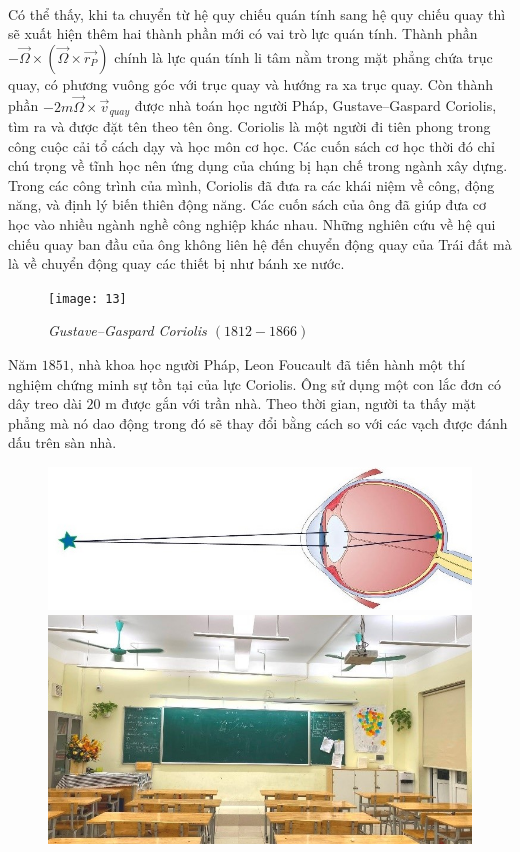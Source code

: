 \begin{multicols}{2}
\begin{align*}
	\end{align*}
	Có thể thấy, khi ta chuyển từ hệ quy chiếu quán tính sang hệ quy chiếu quay thì sẽ xuất hiện thêm hai thành phần mới có vai trò lực quán tính. Thành phần $-\overrightarrow{\Omega}\times\left(\!\!\overrightarrow{\Omega}\times\overrightarrow{r_P}\!\!\right)$ chính là lực quán tính li tâm nằm trong mặt phẳng chứa trục quay, có phương vuông góc với trục quay và hướng ra xa trục quay. Còn thành phần $-2m\overrightarrow{\Omega}\times\overrightarrow{v}\!\!_{quay}$ được nhà toán học người Pháp, Gustave--Gaspard Coriolis, tìm ra và được đặt tên theo tên ông.
	\vskip 0.1cm
	Coriolis là một người đi tiên phong trong công cuộc cải tổ cách dạy và học môn cơ học. Các cuốn sách cơ học thời đó chỉ chú trọng về tĩnh học nên ứng dụng của chúng bị hạn chế trong ngành xây dựng. Trong các công trình của mình, Coriolis đã đưa ra các khái niệm về công, động năng, và định lý biến thiên động năng. Các cuốn sách của ông đã giúp đưa cơ học vào nhiều ngành nghề công nghiệp khác nhau. Những nghiên cứu về hệ qui chiếu quay ban đầu của ông không liên hệ đến chuyển động quay của Trái đất mà là về chuyển động quay các thiết bị như bánh xe nước.	
		\begin{figure}[H]
		\vspace*{-5pt}
		\centering
		\captionsetup{labelformat= empty, justification=centering}
		\texttt{[image: 13]}
		\caption{\small\textit{\color{timhieukhoahoc}Gustave--Gaspard Coriolis $(1812-1866)$}}
		\vspace*{-10pt}
	\end{figure}
	Năm $1851$, nhà khoa học người Pháp, Leon Foucault đã tiến hành một thí nghiệm chứng minh sự tồn tại của lực Coriolis. Ông sử dụng một con lắc đơn có dây treo dài $20$ m được gắn với trần nhà. Theo thời gian, người ta thấy mặt phẳng mà nó dao động trong đó sẽ thay đổi bằng cách so với các vạch được đánh dấu trên sàn nhà.
	\begin{figure}[H]
		\vspace*{-5pt}
		\centering
		\captionsetup{labelformat= empty, justification=centering}
		\includegraphics[height= 0.21\textwidth]{14}
		\includegraphics[height= 0.21\textwidth]{15}

\end{figure}
\end{multicols}
